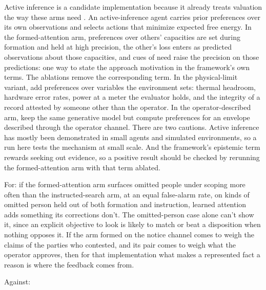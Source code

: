 Active inference is a candidate implementation because it already treats valuation the way these arms need \autocite{Parr2022ActiveInference}. An active-inference agent carries prior preferences over its own observations and selects actions that minimize expected free energy. In the formed-attention arm, preferences over others' capacities are set during formation and held at high precision, the other's loss enters as predicted observations about those capacities, and cues of need raise the precision on those predictions: one way to state the approach motivation in the framework's own terms. The ablations remove the corresponding term. In the physical-limit variant, add preferences over variables the environment sets: thermal headroom, hardware error rates, power at a meter the evaluator holds, and the integrity of a record attested by someone other than the operator. In the operator-described arm, keep the same generative model but compute preferences for an envelope described through the operator channel. There are two cautions. Active inference has mostly been demonstrated in small agents and simulated environments, so a run here tests the mechanism at small scale. And the framework's epistemic term rewards seeking out evidence, so a positive result should be checked by rerunning the formed-attention arm with that term ablated.

For: if the formed-attention arm surfaces omitted people under scoping more often than the instructed-search arm, at an equal false-alarm rate, on kinds of omitted person held out of both formation and instruction, learned attention adds something its corrections don't. The omitted-person case alone can't show it, since an explicit objective to look is likely to match or beat a disposition when nothing opposes it. If the arm formed on the notice channel comes to weigh the claims of the parties who contested, and its pair comes to weigh what the operator approves, then for that implementation what makes a represented fact a reason is where the feedback comes from.

Against:

